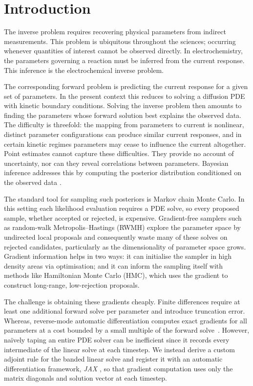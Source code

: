 \chapter{Introduction}\label{ch:introduction}

The inverse problem requires recovering physical parameters
from indirect measurements. This problem is ubiquitous throughout the
sciences; occurring whenever quantities of interest cannot be observed
directly. In electrochemistry, the parameters governing a reaction
must be inferred from the current response. This inference is the
electrochemical inverse problem.

The corresponding forward problem is predicting the current response
for a given set of parameters. In the present context this reduces to
solving a diffusion PDE with kinetic boundary conditions. Solving the
inverse problem then amounts to finding the parameters whose forward
solution best explains the observed data. The difficulty is
threefold: the mapping from parameters to current is nonlinear,
distinct parameter configurations can produce similar current responses,
and in certain kinetic regimes parameters may cease to influence the
current altogether. Point estimates cannot capture these
difficulties. They provide no account of uncertainty, nor can they
reveal correlations between parameters. Bayesian inference addresses
this by computing the posterior distribution conditioned on the
observed data \cite{gavaghan2018bayesian}.

The standard tool for sampling such posteriors is Markov chain Monte
Carlo. In this setting each likelihood evaluation requires a PDE solve,
so every proposed sample, whether accepted or rejected, is expensive.
Gradient-free samplers such as random-walk Metropolis--Hastings (RWMH)
explore the parameter space by undirected local proposals and
consequently waste many of these solves on rejected candidates,
particularly as the dimensionality of parameter space grows. Gradient
information helps in two ways: it can initialise the sampler in high
density areas via optimisation; and it can inform the sampling itself
with methods like Hamiltonian Monte Carlo (HMC), which uses the
gradient to construct long-range, low-rejection proposals.

The challenge is obtaining these gradients cheaply. Finite differences
require at least one additional forward solve per parameter and introduce
truncation error. Whereas, reverse-mode automatic differentiation computes exact
gradients for all parameters at a cost bounded by a small multiple of
the forward solve~\cite{griewank2008evaluating}. However, na\"ively taping an
entire PDE solver can be inefficient since it records every
intermediate of the linear solve at each timestep. We instead derive
a custom adjoint rule for the banded linear solve and register it
with an automatic differentiation framework, \emph{JAX}
\cite{jax2018github}, so that gradient computation uses only the
matrix diagonals and solution vector at each timestep.

